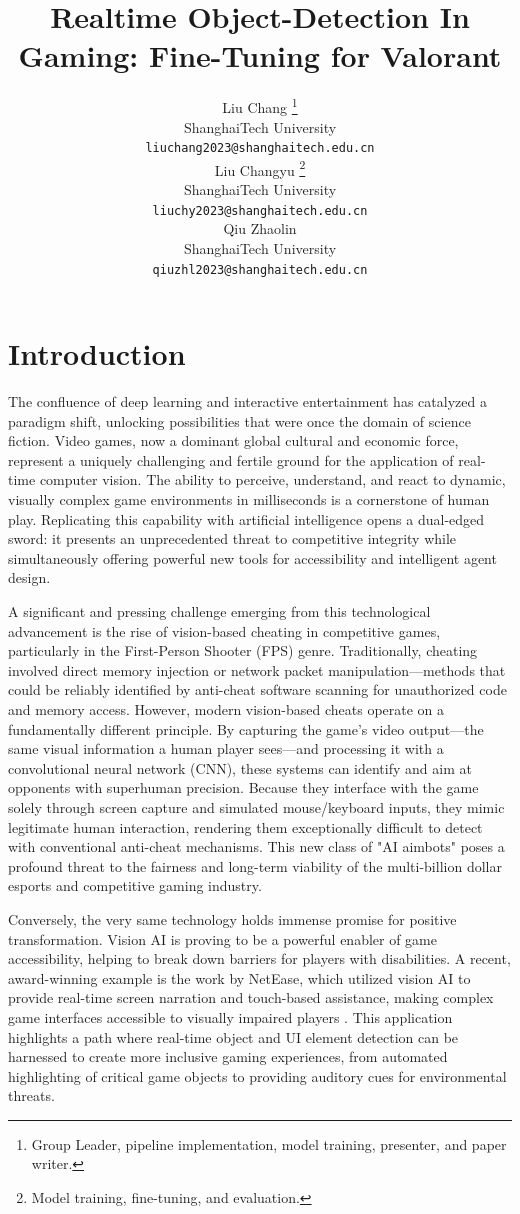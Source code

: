 \documentclass{article}
\title{Realtime Object-Detection In Gaming: Fine-Tuning for Valorant}
\author{
  Liu Chang \thanks{
    Group Leader, pipeline implementation, model training, presenter, and paper writer.
  }\\
  ShanghaiTech University\\
  \texttt{liuchang2023@shanghaitech.edu.cn} \\
  \And
  Liu Changyu \thanks{
    Model training, fine-tuning, and evaluation.
  }\\
  ShanghaiTech University\\
  \texttt{liuchy2023@shanghaitech.edu.cn} \\
  \And
  Qiu Zhaolin\\
  ShanghaiTech University\\
  \texttt{qiuzhl2023@shanghaitech.edu.cn} \\
}
\begin{document}
\maketitle


\begin{abstract}

\end{abstract}


\section{Introduction}


The confluence of deep learning and interactive entertainment has catalyzed a paradigm shift, unlocking possibilities that were once the domain of science fiction. Video games, now a dominant global cultural and economic force, represent a uniquely challenging and fertile ground for the application of real-time computer vision. The ability to perceive, understand, and react to dynamic, visually complex game environments in milliseconds is a cornerstone of human play. Replicating this capability with artificial intelligence opens a dual-edged sword: it presents an unprecedented threat to competitive integrity while simultaneously offering powerful new tools for accessibility and intelligent agent design.

A significant and pressing challenge emerging from this technological advancement is the rise of vision-based cheating in competitive games, particularly in the First-Person Shooter (FPS) genre. Traditionally, cheating involved direct memory injection or network packet manipulation—methods that could be reliably identified by anti-cheat software scanning for unauthorized code and memory access. However, modern vision-based cheats operate on a fundamentally different principle. By capturing the game's video output—the same visual information a human player sees—and processing it with a convolutional neural network (CNN), these systems can identify and aim at opponents with superhuman precision. Because they interface with the game solely through screen capture and simulated mouse/keyboard inputs, they mimic legitimate human interaction, rendering them exceptionally difficult to detect with conventional anti-cheat mechanisms. This new class of "AI aimbots" poses a profound threat to the fairness and long-term viability of the multi-billion dollar esports and competitive gaming industry.

Conversely, the very same technology holds immense promise for positive transformation. Vision AI is proving to be a powerful enabler of game accessibility, helping to break down barriers for players with disabilities. A recent, award-winning example is the work by NetEase, which utilized vision AI to provide real-time screen narration and touch-based assistance, making complex game interfaces accessible to visually impaired players \cite{neteaseAIEyes2024}. This application highlights a path where real-time object and UI element detection can be harnessed to create more inclusive gaming experiences, from automated highlighting of critical game objects to providing auditory cues for environmental threats.
\end{document}
